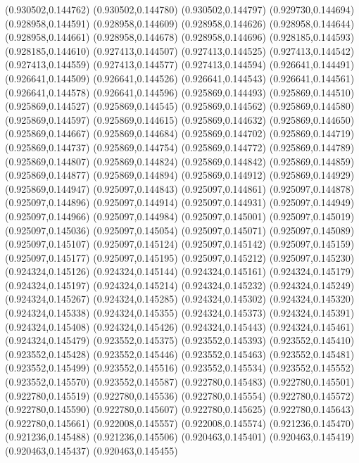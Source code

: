 (0.930502,0.144762)
(0.930502,0.144780)
(0.930502,0.144797)
(0.929730,0.144694)
(0.928958,0.144591)
(0.928958,0.144609)
(0.928958,0.144626)
(0.928958,0.144644)
(0.928958,0.144661)
(0.928958,0.144678)
(0.928958,0.144696)
(0.928185,0.144593)
(0.928185,0.144610)
(0.927413,0.144507)
(0.927413,0.144525)
(0.927413,0.144542)
(0.927413,0.144559)
(0.927413,0.144577)
(0.927413,0.144594)
(0.926641,0.144491)
(0.926641,0.144509)
(0.926641,0.144526)
(0.926641,0.144543)
(0.926641,0.144561)
(0.926641,0.144578)
(0.926641,0.144596)
(0.925869,0.144493)
(0.925869,0.144510)
(0.925869,0.144527)
(0.925869,0.144545)
(0.925869,0.144562)
(0.925869,0.144580)
(0.925869,0.144597)
(0.925869,0.144615)
(0.925869,0.144632)
(0.925869,0.144650)
(0.925869,0.144667)
(0.925869,0.144684)
(0.925869,0.144702)
(0.925869,0.144719)
(0.925869,0.144737)
(0.925869,0.144754)
(0.925869,0.144772)
(0.925869,0.144789)
(0.925869,0.144807)
(0.925869,0.144824)
(0.925869,0.144842)
(0.925869,0.144859)
(0.925869,0.144877)
(0.925869,0.144894)
(0.925869,0.144912)
(0.925869,0.144929)
(0.925869,0.144947)
(0.925097,0.144843)
(0.925097,0.144861)
(0.925097,0.144878)
(0.925097,0.144896)
(0.925097,0.144914)
(0.925097,0.144931)
(0.925097,0.144949)
(0.925097,0.144966)
(0.925097,0.144984)
(0.925097,0.145001)
(0.925097,0.145019)
(0.925097,0.145036)
(0.925097,0.145054)
(0.925097,0.145071)
(0.925097,0.145089)
(0.925097,0.145107)
(0.925097,0.145124)
(0.925097,0.145142)
(0.925097,0.145159)
(0.925097,0.145177)
(0.925097,0.145195)
(0.925097,0.145212)
(0.925097,0.145230)
(0.924324,0.145126)
(0.924324,0.145144)
(0.924324,0.145161)
(0.924324,0.145179)
(0.924324,0.145197)
(0.924324,0.145214)
(0.924324,0.145232)
(0.924324,0.145249)
(0.924324,0.145267)
(0.924324,0.145285)
(0.924324,0.145302)
(0.924324,0.145320)
(0.924324,0.145338)
(0.924324,0.145355)
(0.924324,0.145373)
(0.924324,0.145391)
(0.924324,0.145408)
(0.924324,0.145426)
(0.924324,0.145443)
(0.924324,0.145461)
(0.924324,0.145479)
(0.923552,0.145375)
(0.923552,0.145393)
(0.923552,0.145410)
(0.923552,0.145428)
(0.923552,0.145446)
(0.923552,0.145463)
(0.923552,0.145481)
(0.923552,0.145499)
(0.923552,0.145516)
(0.923552,0.145534)
(0.923552,0.145552)
(0.923552,0.145570)
(0.923552,0.145587)
(0.922780,0.145483)
(0.922780,0.145501)
(0.922780,0.145519)
(0.922780,0.145536)
(0.922780,0.145554)
(0.922780,0.145572)
(0.922780,0.145590)
(0.922780,0.145607)
(0.922780,0.145625)
(0.922780,0.145643)
(0.922780,0.145661)
(0.922008,0.145557)
(0.922008,0.145574)
(0.921236,0.145470)
(0.921236,0.145488)
(0.921236,0.145506)
(0.920463,0.145401)
(0.920463,0.145419)
(0.920463,0.145437)
(0.920463,0.145455)
